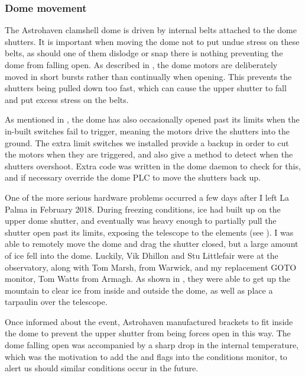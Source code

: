 \begin{colsection}
\subsubsection{Dome movement}

The Astrohaven clamshell dome is driven by internal belts attached to the dome shutters. It is important when moving the dome not to put undue stress on these belts, as should one of them dislodge or snap there is nothing preventing the dome from falling open. As described in , the dome motors are deliberately moved in short bursts rather than continually when opening. This prevents the shutters being pulled down too fast, which can cause the upper shutter to fall and put excess stress on the belts.

As mentioned in , the dome has also occasionally opened past its limits when the in-built switches fail to trigger, meaning the motors drive the shutters into the ground. The extra limit switches we installed provide a backup in order to cut the motors when they are triggered, and also give a method to detect when the shutters overshoot. Extra code was written in the dome daemon to check for this, and if necessary override the dome PLC to move the shutters back up.

One of the more serious hardware problems occurred a few days after I left La Palma in February 2018. During freezing conditions, ice had built up on the upper dome shutter, and eventually was heavy enough to partially pull the shutter open past its limits, exposing the telescope to the elements (see ). I was able to remotely move the dome and drag the shutter closed, but a large amount of ice fell into the dome. Luckily, Vik Dhillon and Stu Littlefair were at the observatory, along with Tom Marsh, from Warwick, and my replacement GOTO monitor, Tom Watts from Armagh. As shown in , they were able to get up the mountain to clear ice from inside and outside the dome, as well as place a tarpaulin over the telescope.

Once informed about the event, Astrohaven manufactured brackets to fit inside the dome to prevent the upper shutter from being forces open in this way. The dome falling open was accompanied by a sharp drop in the internal temperature, which was the motivation to add the  and  flags into the conditions monitor, to alert us should similar conditions occur in the future.


\end{colsection}
